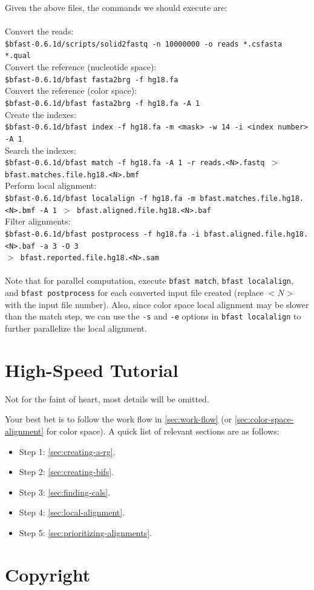 \documentclass[a4paper,12pt]{book}
\newcommand{\Version}{0.6.1d}
\newcommand{\TT}[1]{{\tt #1}} %
\begin{document}
Given the above files, the commands we should execute are:
\\\\
Convert the reads:\\
{\tt \scriptsize \$bfast-\Version{}/scripts/solid2fastq -n 10000000 -o reads *.csfasta *.qual\\}
Convert the reference (nucleotide space):\\
{\tt \scriptsize \$bfast-\Version{}/bfast fasta2brg -f hg18.fa\\}
Convert the reference (color space):\\
{\tt \scriptsize \$bfast-\Version{}/bfast fasta2brg -f hg18.fa -A 1 \\}
Create the indexes:\\
{\tt \scriptsize \$bfast-\Version{}/bfast index -f hg18.fa -m <mask> -w 14 -i <index number> -A 1\\}
Search the indexes:\\
{\tt \scriptsize \$bfast-\Version{}/bfast match -f hg18.fa -A 1 -r reads.<N>.fastq $>$ bfast.matches.file.hg18.<N>.bmf\\}
Perform local alignment:\\
{\tt \scriptsize \$bfast-\Version{}/bfast localalign -f hg18.fa -m bfast.matches.file.hg18.<N>.bmf -A 1 $>$ bfast.aligned.file.hg18.<N>.baf\\}
Filter alignments:\\
{\tt \scriptsize \$bfast-\Version{}/bfast postprocess -f hg18.fa -i bfast.aligned.file.hg18.<N>.baf -a 3 -O 3\\
$>$ bfast.reported.file.hg18.<N>.sam\\}
\\
Note that for parallel computation, execute {\tt bfast match}, {\tt bfast localalign}, and {\tt bfast postprocess} for each converted input file created (replace $<N>$ with the input file number).
Also, since color space local alignment may be slower than the match step, we can use the \TT{-s} and \TT{-e} options in {\tt bfast localalign} to further parallelize the local alignment.

\section{High-Speed Tutorial}
\label{sec:high-speed-tutorial}
Not for the faint of heart, most details will be omitted.

Your best bet is to follow the work flow in \autoref{sec:work-flow} (or \autoref{sec:color-space-alignment} for color space).
A quick list of relevant sections are as follows:
\begin{itemize}
	\item Step 1: \autoref{sec:creating-a-rg}.
	\item Step 2: \autoref{sec:creating-bifs}.
	\item Step 3: \autoref{sec:finding-cals}.
	\item Step 4: \autoref{sec:local-alignment}.
	\item Step 5: \autoref{sec:prioritizing-alignments}.
\end{itemize}
\section{Copyright}


{}


\end{document}
